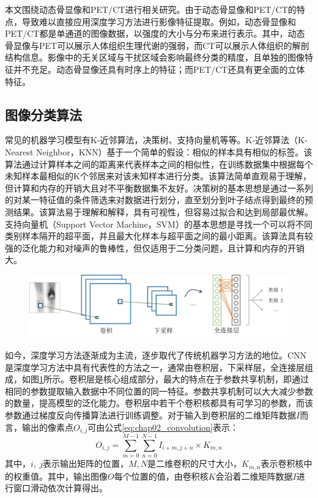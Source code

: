本文围绕动态骨显像和PET/CT进行相关研究。由于动态骨显像和PET/CT的特点，导致难以直接应用深度学习方法进行影像特征提取。例如，动态骨显像和PET/CT都是单通道的图像数据，以强度的大小与分布来进行表示。其中，动态骨显像与PET可以展示人体组织生理代谢的强弱，而CT可以展示人体组织的解剖结构信息。影像中的无关区域与干扰区域会影响最终分类的精度，且单独的图像特征并不充足。动态骨显像还具有时序上的特征；而PET/CT还具有更全面的立体特征。

\subsection{图像分类算法}

常见的机器学习模型有K-近邻算法，决策树、支持向量机等等。K-近邻算法（K-Nearest Neighbor，KNN）\cite{guo2003knn}基于一个简单的假设：相似的样本具有相似的标签。该算法通过计算样本之间的距离来代表样本之间的相似性，在训练数据集中根据每个未知样本最相似的K个邻居来对该未知样本进行分类。该算法简单直观易于理解，但计算和内存的开销大且对不平衡数据集不友好。决策树\cite{suthaharan2016decision}的基本思想是通过一系列的对某一特征值的条件筛选来对数据进行划分，直至划分到叶子结点得到最终的预测结果。该算法易于理解和解释，具有可视性，但容易过拟合和达到局部最优解。支持向量机（Support Vector Machine，SVM）\cite{suthaharan2016support}的基本思想是寻找一个可以将不同类别样本隔开的超平面，并且最大化样本与超平面之间的最小距离。该算法具有较强的泛化能力和对噪声的鲁棒性，但仅适用于二分类问题，且计算和内存的开销大。

\begin{figure}[h]
  \centering
  \includegraphics[width=\textwidth]{figures/chap02_cnn.jpg}
  \label{fig:chap02_cnn}
\end{figure}

如今，深度学习方法逐渐成为主流，逐步取代了传统机器学习方法的地位。CNN是深度学习方法中具有代表性的方法之一，通常由卷积层，下采样层，全连接层组成，如图\ref{fig:chap02_cnn}所示。卷积层是核心组成部分，最大的特点在于参数共享机制，即通过相同的参数提取输入数据中不同位置的同一特征。参数共享机制可以大大减少参数的数量，提高模型的泛化能力。卷积层中若干个卷积核都具有可学习的参数，而该参数通过梯度反向传播算法进行训练调整。对于输入到卷积层的二维矩阵数据\(I\)而言，输出的像素点\(O_{i,j}\)可由公式\ref{eq:chap02_convolution}表示：
\begin{equation}
  O_{i,j} = \sum_{m=0}^{M-1}\sum_{n=0}^{N-1}I_{i+m, j+n}\times K_{m,n}
  \label{eq:chap02_convolution}
\end{equation}
其中，\(i,\ j\)表示输出矩阵的位置，\(M,N\)是二维卷积的尺寸大小，\(K_{m,n}\)表示卷积核中的权重值。其中，输出图像\(O\)每个位置的值，由卷积核\(K\)会沿着二维矩阵数据\(I\)进行窗口滑动依次计算得出。

